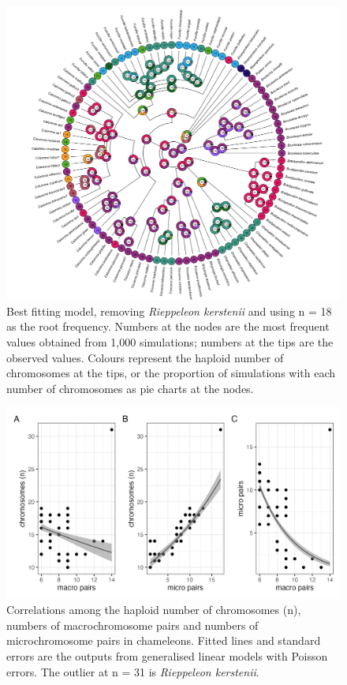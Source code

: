\documentclass[a4paper, 12pt]{article}
\begin{document}
\newpage
\begin{figure}[h]
 \centering
  \includegraphics[width = \linewidth]{figures/new-tree-plot4.png}
  \caption{Best fitting model, removing \textit{Rieppeleon kerstenii} and using n = 18 as the root frequency. Numbers at the nodes are the most frequent values obtained from 1,000 simulations; numbers at the tips are the observed values. Colours represent the haploid number of chromosomes at the tips, or the proportion of simulations with each number of chromosomes as pie charts at the nodes.
}
  \label{fig-best}
\end{figure}

\newpage
\begin{figure}[h]
 \centering
  \includegraphics[width = \linewidth]{figures/micro-macro-chromosomes.png}
  \caption{Correlations among the haploid number of chromosomes (n), numbers of macrochromosome pairs and numbers of microchromosome pairs in chameleons. Fitted lines and standard errors are the outputs from generalised linear models with Poisson errors. The outlier at n = 31 is \textit{Rieppeleon kerstenii}.
}
  \label{fig-chroms}
\end{figure}
\end{document}
